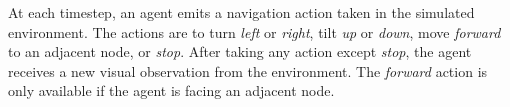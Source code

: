 At each timestep, an agent emits a navigation action taken in the simulated environment.
The actions are to turn \textit{left} or \textit{right}, tilt \textit{up} or \textit{down}, move \textit{forward} to an adjacent node, or \textit{stop}.
After taking any action except \textit{stop}, the agent receives a new visual observation from the environment.
The \textit{forward} action is only available if the agent is facing an adjacent node.
